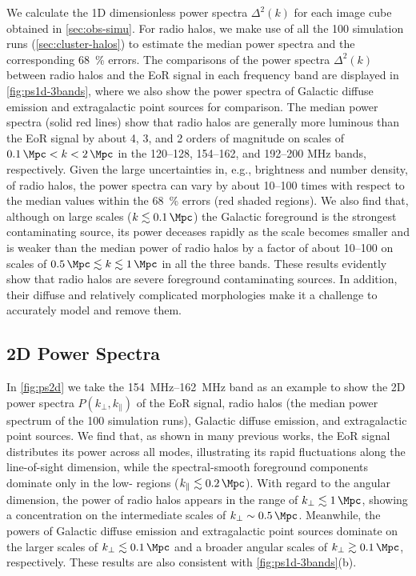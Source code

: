 \documentclass[twocolumn]{aastex62}
\newcommand{\klos}{\text{$k_{\parallel}$}}
\newcommand{\kperp}{\text{$k_{\bot}$}}
\begin{document}
We calculate the 1D dimensionless power spectra $\Delta^2(k)$ for each
image cube obtained in \autoref{sec:obs-simu}.
For radio halos, we make use of all the 100 simulation runs
(\autoref{sec:cluster-halos}) to estimate the median power spectra and
the corresponding \SI{68}{\percent} errors.
The comparisons of the power spectra $\Delta^2(k)$ between radio halos
and the EoR signal in each frequency band are displayed
in \autoref{fig:ps1d-3bands}, where we also show the power spectra of
Galactic diffuse emission and extragalactic point sources for comparison.
The median power spectra (solid red lines) show that radio halos are
generally more luminous than the EoR signal by about 4, 3, and 2 orders
of magnitude on scales of $\SI{0.1}{\per\Mpc} < k < \SI{2}{\per\Mpc}$
in the \numrange{120}{128}, \numrange{154}{162}, and \numrange{192}{200}
\si{\MHz} bands, respectively.
Given the large uncertainties in, e.g., brightness and number density,
of radio halos, the power spectra can vary by about \numrange{10}{100}
times with respect to the median values within the \SI{68}{\percent}
errors (red shaded regions).
We also find that, although on large scales
($k \lesssim \SI{0.1}{\per\Mpc}$) the Galactic foreground is the
strongest contaminating source, its power deceases rapidly as the
scale becomes smaller and is weaker than the median power of radio halos
by a factor of about \numrange{10}{100} on scales of
$\SI{0.5}{\per\Mpc} \lesssim k \lesssim \SI{1}{\per\Mpc}$
in all the three bands.
These results evidently show that radio halos are severe foreground
contaminating sources.
In addition, their diffuse and relatively complicated morphologies make
it a challenge to accurately model and remove them.


\subsection{2D Power Spectra}
\label{sec:ps2d}

In \autoref{fig:ps2d} we take the \SIrange{154}{162}{\MHz} band as an
example to show the 2D power spectra $P(\kperp, \klos)$ of the EoR signal,
radio halos (the median power spectrum of the 100 simulation runs),
Galactic diffuse emission, and extragalactic point sources.
We find that, as shown in many previous works,
the EoR signal distributes its power across all \klos{} modes,
illustrating its rapid fluctuations along the line-of-sight dimension,
while the spectral-smooth foreground components dominate only in the
low-\klos{} regions ($\klos{} \lesssim \SI{0.2}{\per\Mpc}$).
With regard to the angular dimension, the power of radio halos appears in
the range of $\kperp \lesssim \SI{1}{\per\Mpc}$, showing a concentration
on the intermediate scales of $\kperp \sim \SI{0.5}{\per\Mpc}$.
Meanwhile, the powers of Galactic diffuse emission and extragalactic
point sources dominate on the larger scales of
$\kperp \lesssim \SI{0.1}{\per\Mpc}$ and a broader angular scales of
$\kperp \gtrsim \SI{0.1}{\per\Mpc}$, respectively.
These results are also consistent with \autoref{fig:ps1d-3bands}(b).
\end{document}
